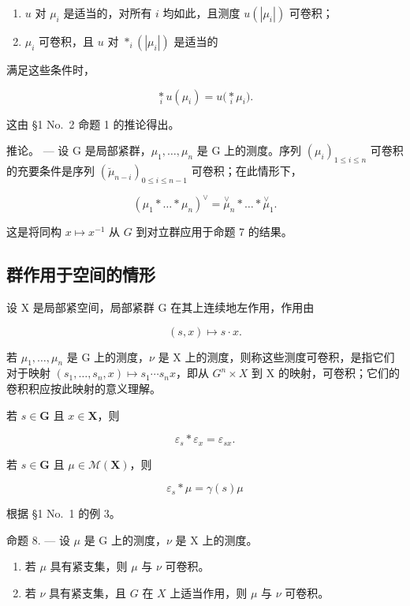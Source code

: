 \begin{enumerate}
\def\labelenumi{(\roman{enumi})}
\item
  \(u\) 对 \(\mu_{i}\) 是适当的，对所有 \(i\) 均如此，且测度 \(u(|\mu_i|)\) 可卷积；
\item
  \(\mu_{i}\) 可卷积，且 \(u\) 对 \(*_{i}(|\mu_{i}|)\) 是适当的
\end{enumerate}

满足这些条件时，

\[
\underset {i} {\ast} u (\mu_ {i}) = u \Big (\underset {i} {\ast} \mu_ {i} \Big).
\]

这由 §1 No.~2 命题 1 的推论得出。

推论。 --- 设 G 是局部紧群，\(\mu_{1},\ldots,\mu_{n}\) 是 G 上的测度。序列 \((\mu_{i})_{1\leqslant i\leqslant n}\) 可卷积的充要条件是序列 \((\breve{\mu}_{n-i})_{0\leqslant i\leqslant n-1}\) 可卷积；在此情形下，

\[
\left(\mu_ {1} * \dots * \mu_ {n}\right) ^ {\vee} = \stackrel {\vee} {\mu} _ {n} * \dots * \stackrel {\vee} {\mu} _ {1}.
\]

这是将同构 \(x \mapsto x^{-1}\) 从 \(G\) 到对立群应用于命题 7 的结果。

\subsection{群作用于空间的情形}

设 X 是局部紧空间，局部紧群 G 在其上连续地左作用，作用由

\[
(s, x) \mapsto s \cdot x.
\]

若 \(\mu_{1},\ldots,\mu_{n}\) 是 G 上的测度，\(\nu\) 是 X 上的测度，则称这些测度可卷积，是指它们对于映射 \((s_{1},\ldots,s_{n},x)\mapsto s_{1}\cdots s_{n}x\)，即从 \(G^{n}\times X\) 到 X 的映射，可卷积；它们的卷积积应按此映射的意义理解。

若 \(s\in \mathbf{G}\) 且 \(x\in \mathbf{X}\)，则

\[
\varepsilon_ {s} * \varepsilon_ {x} = \varepsilon_ {s x}.\tag{4}
\]

若 \(s \in \mathbf{G}\) 且 \(\mu \in \mathcal{M}(\mathbf{X})\)，则

\[
\varepsilon_ {s} * \mu = \gamma (s) \mu\tag{5}
\]

根据 §1 No.~1 的例 3。

命题 8. --- 设 \(\mu\) 是 G 上的测度，\(\nu\) 是 X 上的测度。

\begin{enumerate}
\def\labelenumi{(\roman{enumi})}
\item
  若 \(\mu\) 具有紧支集，则 \(\mu\) 与 \(\nu\) 可卷积。
\item
  若 \(\nu\) 具有紧支集，且 \(G\) 在 \(X\) 上适当作用，则 \(\mu\) 与 \(\nu\) 可卷积。
\end{enumerate}

